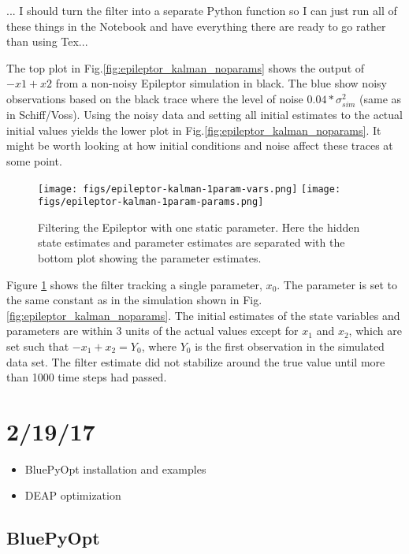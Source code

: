 \documentclass[11pt]{article}
\begin{document}
			{\color{red}... I should turn the filter into a separate Python function so I can just run all of these things in the Notebook and have everything there are ready to go rather than using Tex...}

			The top plot in Fig.\ref{fig:epileptor_kalman_noparams} shows the output of $-x1 + x2$ from a non-noisy Epileptor simulation in black. The blue show noisy observations based on the black trace where the level of noise $0.04*\sigma_{sim}^2$ (same as in Schiff/Voss). Using the noisy data and setting all initial estimates to the actual initial values yields the lower plot in Fig.\ref{fig:epileptor_kalman_noparams}. {\color{red} It might be worth looking at how initial conditions and noise affect these traces at some point.}

			\begin{figure}[htbp!]
			\texttt{[image: figs/epileptor-kalman-1param-vars.png]}
			\texttt{[image: figs/epileptor-kalman-1param-params.png]}
			\caption{Filtering the Epileptor with one static parameter. Here the hidden state estimates and parameter estimates are separated with the bottom plot showing the parameter estimates.}
			\label{fig:kalman_epileptor_oneparam}
			\end{figure}

			Figure \ref{fig:kalman_epileptor_oneparam} shows the filter tracking a single parameter, $x_0$. The parameter is set to the same constant as in the simulation shown in Fig.\ref{fig:epileptor_kalman_noparams}. The initial estimates of the state variables and parameters are within 3 units of the actual values except for $x_1$ and $x_2$, which are set such that $-x_1 + x_2 = Y_0$, where $Y_0$ is the first observation in the simulated data set. The filter estimate did not stabilize around the true value until more than \num{1000} time steps had passed. 



\section{2/19/17} %
	\label{sec:2_19_17}
	\begin{itemize}
		\item BluePyOpt installation and examples
		\item DEAP optimization
	\end{itemize}

	\subsection{BluePyOpt} %
		\label{sub:bluepyopt}
\end{document}
